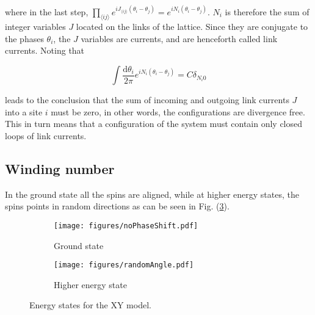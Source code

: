 \noindent where in the last step, $\prod_{\langle ij \rangle} e^{iJ_{\langle ij \rangle} (\theta_i - \theta_j)} = e^{iN_i (\theta_i - \theta_j)}$. $N_i$ is therefore the sum of integer variables $J$ located on the links of the lattice. Since they are conjugate to the phases $\theta_i$, the $J$ variables are currents, and are henceforth called link currents. Noting that

\begin{equation}
    \int \frac{\mathrm d \theta_i}{2 \pi} e^{i N_i (\theta_i - \theta_j)} = C \delta_{N_i 0}
\end{equation}

\noindent leads to the conclusion that the sum of incoming and outgoing link currents $J$ into a site $i$ must be zero, in other words, the configurations are divergence free. This in turn means that a configuration of the system must contain only closed loops of link currents.


\subsection{Winding number}
\label{subsec:XYWindingNum}

In the ground state all the spins are aligned, while at higher energy states, the spins points in random directions as can be seen in Fig. (\ref{fig:xygroundhigher}).

\begin{figure}[h!]
\centering
    \begin{subfigure}{.4\textwidth}
        \centering
        \texttt{[image: figures/noPhaseShift.pdf]}
        \caption{Ground state}
        \label{fig:xyground}
    \end{subfigure}
    \begin{subfigure}{.4\textwidth}
        \centering
        \texttt{[image: figures/randomAngle.pdf]}
        \caption{Higher energy state}
        \label{fig:xyhigher}
    \end{subfigure}
    \caption{Energy states for the XY model.}
\label{fig:xygroundhigher}
\end{figure}

